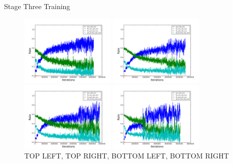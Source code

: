 \documentclass{beamer}
\begin{document}
\begin{frame}{Stage Three Training}
\begin{figure}
    \centering
    \begin{minipage}{4.5cm}
    \includegraphics[width=4.5cm]{top_left.png}
    \end{minipage}
    \begin{minipage}{4.5cm}
    \includegraphics[width=4.5cm]{top_right.png}
    \end{minipage}
    
    \begin{minipage}{4.5cm}
    \includegraphics[width=4.5cm]{bottom_left.png}
    \end{minipage}
    \begin{minipage}{4.5cm}
    \includegraphics[width=4.5cm]{bottom_right.png}
    \end{minipage}
    \caption{TOP LEFT, TOP RIGHT,
             BOTTOM LEFT, BOTTOM RIGHT}
\end{figure} 
\end{frame}
\end{document}
